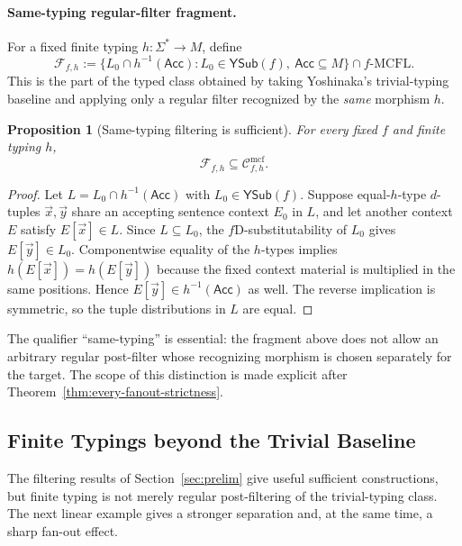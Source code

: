 \documentclass[11pt]{article}
\numberwithin{equation}{section}
\theoremstyle{plain}
\newtheorem{proposition}[theorem]{Proposition}
\theoremstyle{definition}
\theoremstyle{remark}
\newcommand{\Cmcf}[2]{\mathcal{C}^{\mathrm{mcf}}_{#1,#2}}
\newcommand{\Ffrag}[2]{\mathcal{F}_{#1,#2}}
\newcommand{\tuple}[1]{\vec{#1}}
\newcommand{\YSub}[1]{\mathsf{YSub}(#1)}
\begin{document}
\paragraph{Same-typing regular-filter fragment.}
For a fixed finite typing $h:\Sigma^*\to M$, define
\[
  \Ffrag{f}{h}
  :=\bigl\{L_0\cap h^{-1}(\mathsf{Acc}):L_0\in\YSub{f},\ \mathsf{Acc}\subseteq M\bigr\}
    \cap f\text{-}\mathrm{MCFL}.
\]
This is the part of the typed class obtained by taking Yoshinaka's trivial-typing
baseline and applying only a regular filter recognized by the \emph{same}
morphism $h$.

\begin{proposition}[Same-typing filtering is sufficient]
\label{prop:same-typing-filter-fragment}
For every fixed $f$ and finite typing $h$,
\[
  \Ffrag{f}{h}\subseteq\Cmcf{f}{h}.
\]
\end{proposition}

\begin{proof}
Let $L=L_0\cap h^{-1}(\mathsf{Acc})$ with $L_0\in \YSub{f}$.  Suppose equal-$h$-type
$d$-tuples $\tuple x,\tuple y$ share an accepting sentence context $E_0$ in
$L$, and let another context $E$ satisfy $E[\tuple x]\in L$.  Since
$L\subseteq L_0$, the $f$D-substitutability of $L_0$ gives
$E[\tuple y]\in L_0$.  Componentwise equality of the $h$-types implies
$h(E[\tuple x])=h(E[\tuple y])$ because the fixed context material is
multiplied in the same positions.  Hence $E[\tuple y]\in h^{-1}(\mathsf{Acc})$ as well.
The reverse implication is symmetric, so the tuple distributions in $L$ are
equal.
\end{proof}

The qualifier ``same-typing'' is essential: the fragment above does not
allow an arbitrary regular post-filter whose recognizing morphism is chosen
separately for the target.  The scope of this distinction is made explicit
after Theorem~\ref{thm:every-fanout-strictness}.

\subsection{Finite Typings beyond the Trivial Baseline}
\label{subsec:finite-typing-separations}


The filtering results of Section~\ref{sec:prelim} give useful sufficient
constructions, but finite typing is not merely regular post-filtering of the
trivial-typing class.  The next linear example gives a stronger separation and,
at the same time, a sharp fan-out effect.
\end{document}
